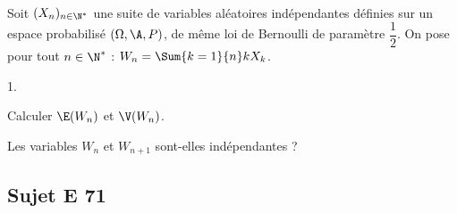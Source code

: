 \documentclass[11pt]{article}%
\begin{document}

\begin{exerciceSP}~\\
  Soit $(X_n)_{n\in\N^*}$ une suite de variables aléatoires
  indépendantes définies sur un espace probabilisé $(\Omega,\A,P)$, de
  même loi de Bernoulli de paramètre $\dfrac{1}{2}$. On pose pour tout
  $n\in\N^*$ : $W_n=\Sum{k=1}{n} k X_k$.
  \begin{noliste}{1.}
    \setlength{\itemsep}{2mm}
  \item Calculer $\E(W_n)$ et $\V(W_n)$.
  \item Les variables $W_n$ et $W_{n+1}$ sont-elles indépendantes ?
  \end{noliste}
\end{exerciceSP}


\newpage

\subsection*{Sujet E 71}

\end{document}
